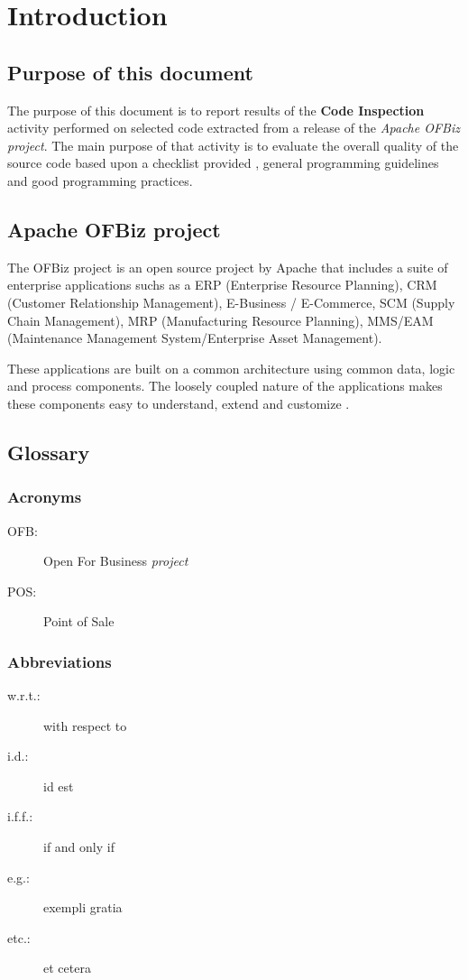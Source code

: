 \section{Introduction}

\subsection{Purpose of this document}
The purpose of this document is to report results of the \textbf{Code Inspection} activity performed on selected code extracted from a release of the \textit{Apache OFBiz project}. The main purpose of that activity is to evaluate the overall quality of the source code based upon a checklist provided \cite{Assignment}, general programming guidelines and good programming practices.

\subsection{Apache OFBiz project}
The OFBiz project is an open source project by Apache that  includes a suite of enterprise applications suchs as a ERP (Enterprise Resource Planning), CRM (Customer Relationship Management), E-Business / E-Commerce, SCM (Supply Chain Management), MRP (Manufacturing Resource Planning), MMS/EAM (Maintenance Management System/Enterprise Asset Management).

These applications are built on a common architecture using common data, logic and process components. The loosely coupled nature of the applications makes these components easy to understand, extend and customize \cite{OFBiz}.

\subsection{Glossary}
\subsubsection{Acronyms}
\begin{description}
		\item [OFB:] Open For Business \emph{project}
		\item [POS:] Point of Sale
	\end{description}
\subsubsection{Abbreviations}
	\begin{description}
		\item [w.r.t.:] with respect to
		\item [i.d.:] id est
		\item [i.f.f.:] if and only if
		\item [e.g.:] exempli gratia
		\item [etc.:] et cetera
	\end{description}

